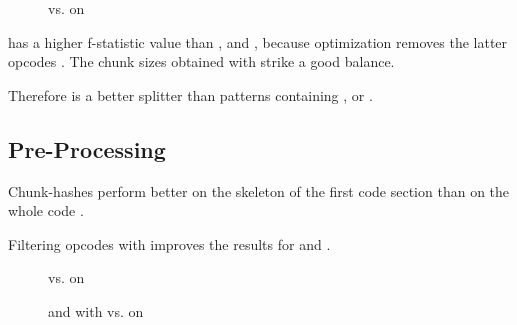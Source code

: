 \documentclass[../main.tex]{subfiles}
\begin{document}
\begin{figure}[ht!]
  \centering
  \caption{ vs.  on \n{\solcts}}
  \label{fig:solcJumpPpHist}
\end{figure}

\begin{res}
   has a higher f-statistic value than ,  and  , because optimization removes the latter opcodes .
  The chunk sizes obtained with  strike a good balance.
\end{res}
\begin{conc}
  Therefore  is a better splitter than patterns containing ,  or .
\end{conc}

\subsection{Pre-Processing}
\begin{res}
  Chunk-hashes perform better on the skeleton of the first code section than on the whole code .
\end{res}
\begin{res}
  Filtering opcodes with  improves the results for  and  .
\end{res}

\begin{figure}[ht!]
  \centering
  \caption{ vs.  on }
  \label{fig:wallPpJpSkelRaw}
\end{figure}

\begin{figure}[ht!]
  \centering
  \caption{ and  with  vs.  on }
  \label{fig:fstSekVsFstatWallets}
\end{figure}
\end{document}
